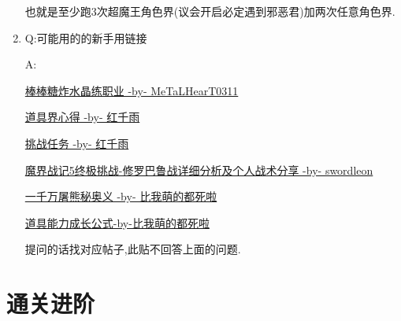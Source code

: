 \begin{enumerate}
	

	也就是至少跑3次超魔王角色界(议会开启必定遇到邪恶君)加两次任意角色界.

	\item
	Q:可能用的的新手用链接

	A:

	\href{http://tieba.baidu.com/p/3717431968}{棒棒糖炸水晶练职业 -by- MeTaLHearT0311}

	\href{http://tieba.baidu.com/p/3730196003}{道具界心得 -by- 红千雨}

	\href{http://tieba.baidu.com/p/3723862919}{挑战任务 -by- 红千雨}

	\href{http://tieba.baidu.com/p/3949061316}{魔界战记5终极挑战-修罗巴鲁战详细分析及个人战术分享 -by- swordleon }

	\href{http://tieba.baidu.com/p/3825275063}{一千万屠熊秘奥义 -by- 比我萌的都死啦}

	\href{http://tieba.baidu.com/f?kz=3834692385}{道具能力成长公式-by-比我萌的都死啦}

	提问的话找对应帖子,此贴不回答上面的问题.


\end{enumerate}

\newpage

\section{通关进阶}


